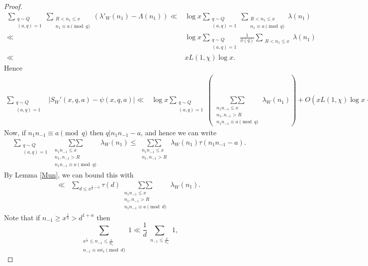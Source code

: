 \documentclass{amsart}
\begin{document}
\begin{proof}
\begin{align*}
\sum_{\substack{q\sim Q  \\ (a,q)=1}}\sum_{\substack{R<n_1\leq x \\ n_1\equiv a\pmod q}}\left(\lambda'_W\left(n_1\right)-\Lambda(n_1)\right)\ll &\log x\sum_{\substack{q\sim Q  \\ (a,q)=1}}\sum_{\substack{R<n_1\leq x \\ n_1\equiv a\pmod q}}\lambda\left(n_1\right)\\
\ll &\log x\sum_{\substack{q\sim Q  \\ (a,q)=1}}\frac{1}{\phi(q)}\sum_{\substack{R<n_1\leq x }}\lambda\left(n_1\right)\\
\ll &xL(1,\chi)\log x.
\end{align*}
Hence
\begin{align*}
\sum_{\substack{q\sim Q  \\ (a,q)=1}}&\left|S_W'(x,q,a)-\psi(x,q,a)\right|\ll &\log x\sum_{\substack{q\sim Q  \\ (a,q)=1}}\left(\mathop{\sum\sum}\limits_{\substack{n_1n_{-1}\leq x \\ n_1,n_{-1}>R \\ n_1n_{-1}\equiv a\pmod q}}\lambda_W\left(n_1\right) \right)+O\left(xL(1,\chi)\log x+R\log^2 x\right).
\end{align*}
Now, if $n_1n_{-1}\equiv a \pmod q$ then $q|n_1n_{-1}-a$, and hence we can write
\begin{align*}
\sum_{\substack{q\sim Q  \\ (a,q)=1}}\mathop{\sum\sum}\limits_{\substack{n_1n_{-1}\leq x \\ n_1,n_{-1}>R \\ n_1n_{-1}\equiv a\pmod q}}\lambda_W\left(n_1\right) \leq \mathop{\sum\sum}\limits_{\substack{n_1n_{-1}\leq x \\ n_1,n_{-1}>R }}\lambda_W\left(n_1\right) \tau(n_1n_{-1}-a).
\end{align*}
By Lemma \ref{Mun}, we can bound this with
\begin{align*}
\ll &\sum_{d\leq x^{\frac 13-\alpha}} \tau(d)\mathop{\sum\sum}\limits_{\substack{n_1n_{-1}\leq x \\ n_1,n_{-1}>R \\ n_1n_{-1}\equiv a\pmod d}}\lambda_W\left(n_1\right) .
\end{align*}
Note that if $n_{-1}\geq x^\frac 13>d^{1+\alpha}$ then
$$\sum_{\substack{x^{\frac 13}\leq n_{-1}\leq \frac x{n_1} \\ n_{-1}\equiv a\overline{n_1}\pmod d}}1\ll \frac 1d\sum_{\substack{n_{-1}\leq \frac x{n_1} }}1,$$

\end{proof}
\end{document}
